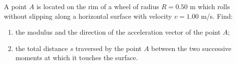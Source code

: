 
\item A point \( A \) is located on the rim of a wheel of radius \( R = 0.50 \) m which rolls without slipping along a horizontal surface with velocity \( v = 1.00 \) m/s. Find:
    \begin{enumerate}
        \item the modulus and the direction of the acceleration vector of the point \( A \);
        \item the total distance \( s \) traversed by the point \( A \) between the two successive moments at which it touches the surface.
    \end{enumerate}
